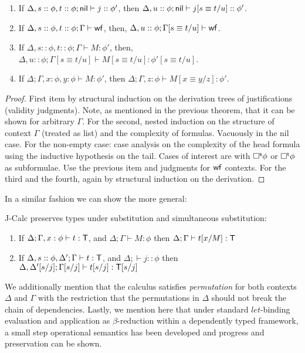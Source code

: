 \documentclass[11pt]{entcs}
\begin{document}
{\begin{theorem}[Contraction]
\begin{enumerate}
\item If $\Delta, s::\phi, t::\phi; {\sf nil} \vdash j::\phi'$, then $\Delta, u::\phi; {\sf nil} \vdash j[s\equiv t/u]::\phi'$.
\item If $\Delta, s::\phi, t::\phi; \Gamma\vdash {\sf wf}$, then, $\Delta,u::\phi; \Gamma[s\equiv t/u]\vdash {\sf wf}$.
\item If $\Delta, s::\phi, t::\phi; \Gamma\vdash M:\phi'$, then, $\Delta,u::\phi; \Gamma[s\equiv t/u]\vdash M[s\equiv t/u]:\phi'[s\equiv t/u]$.
\item If $\Delta; \Gamma, x:\phi, y:\phi \vdash M:\phi'$, then $\Delta; \Gamma, z:\phi \vdash M[x\equiv y/z]:\phi'$.
\end{enumerate}
\end{theorem}
\begin{proof}
First item by structural induction on the derivation trees of justifications (validity judgments). Note, as mentioned in the previous theorem, that it can be shown for arbitrary $\Gamma$. For the second, nested induction on the structure of context $\Gamma$ (treated as list) and the complexity of formulas. Vacuously in the {\sf nil} case. For the non-empty case: case analysis on the complexity of the head formula using the inductive hypothesis on the tail. Cases of interest are with $\Box^{\sf s}\phi$ or $\Box^{\sf t}\phi$ as subformulae. Use the previous item and judgments for ${\sf wf }$ contexts. For the third and the fourth, again by structural induction on the derivation.
\end{proof}

In a similar fashion we can show the more general:

\begin{theorem}
{\sf J-Calc} preserves types under substitution and simultaneous substitution:
\begin{enumerate}
\item {If $\Delta;\Gamma,x:\phi\vdash t:{\sf T}$, and $\Delta;\Gamma\vdash M :\phi$ then $\Delta;\Gamma\vdash t[x/M]:{\sf T}$}
\item{
 If $\Delta, s::\phi,\Delta';\Gamma\vdash t:{\sf T}$, and $\Delta;\vdash j::\phi$ then $\Delta,\Delta'[s/j];\Gamma[s/j]\vdash t[s/j]:{\sf T}[s/j]$}
\end{enumerate}
\end{theorem}

We additionally mention that the calculus satisfies \textit{permutation} for both contexts $\Delta$ and $\Gamma$ with the restriction that the permutations in $\Delta$ should not break the chain of dependencies. Lastly, we mention here that under standard ${let}$-binding evaluation and application as $\beta$-reduction within a dependently typed framework, a small step operational semantics has been developed and progress and preservation can be shown.

}
\end{document}
